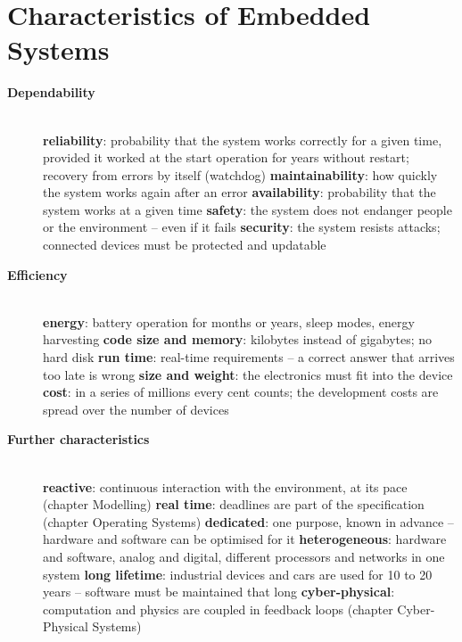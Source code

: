 \section{Characteristics of Embedded Systems}
\begin{description}
\item[{\rot\bf Dependability}]~\\[-\lblskip]
\bi
	\ite \textbf{reliability}: probability that the system works correctly for a given time, provided it worked at the start
	\bi
		\ite operation for years without restart; recovery from errors by itself (watchdog)
	\ei
	\ite \textbf{maintainability}: how quickly the system works again after an error
	\ite \textbf{availability}: probability that the system works at a given time
	\ite \textbf{safety}: the system does not endanger people or the environment -- even if it fails
	\ite \textbf{security}: the system resists attacks; connected devices must be protected and updatable
\ei
{}
\os{\newpage}

\item[{\rot\bf Efficiency}]~\\[-\lblskip]
\bi
	\ite \textbf{energy}: battery operation for months or years, sleep modes, energy harvesting
	\ite \textbf{code size and memory}: kilobytes instead of gigabytes; no hard disk
	\ite \textbf{run time}: real-time requirements -- a correct answer that arrives too late is wrong
	\ite \textbf{size and weight}: the electronics must fit into the device
	\ite \textbf{cost}: in a series of millions every cent counts; the development costs are spread over the number of devices
\ei
\os{\newpage}

\item[{\rot\bf Further characteristics}]~\\[-\lblskip]
\bi
	\ite \textbf{reactive}: continuous interaction with the environment, at its pace (chapter Modelling)
	\ite \textbf{real time}: deadlines are part of the specification (chapter Operating Systems)
	\ite \textbf{dedicated}: one purpose, known in advance -- hardware and software can be optimised for it
	\ite \textbf{heterogeneous}: hardware and software, analog and digital, different processors and networks in one system
	\ite \textbf{long lifetime}: industrial devices and cars are used for 10 to 20 years -- software must be maintained that long
	\ite \textbf{cyber-physical}: computation and physics are coupled in feedback loops (chapter Cyber-Physical Systems)
\ei
\os{\newpage}
\end{description}

